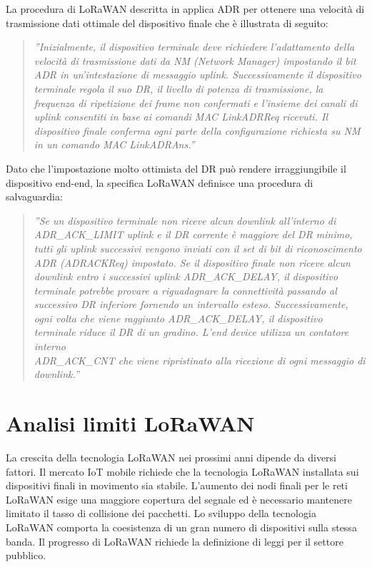 \documentclass[a4paper]{report} %
\begin{document}
La procedura di LoRaWAN descritta in \cite{art:rif.48} applica ADR per ottenere una velocità di trasmissione dati ottimale del dispositivo finale che è illustrata di seguito:
\begin{quote}
	\textit{''Inizialmente, il dispositivo terminale deve richiedere l'adattamento della velocità di trasmissione dati da NM (Network Manager) impostando il bit ADR in un'intestazione di messaggio uplink. Successivamente il dispositivo terminale regola il suo DR, il livello di potenza di trasmissione, la frequenza di ripetizione dei frame non confermati e l'insieme dei canali di uplink consentiti in base ai comandi MAC LinkADRReq ricevuti. Il dispositivo finale conferma ogni parte della configurazione richiesta su NM in un comando MAC LinkADRAns.''}
\end{quote}	
Dato che l'impostazione molto ottimista del DR può rendere irraggiungibile il dispositivo end-end, la specifica LoRaWAN definisce una procedura di salvaguardia: 
\begin{quote}
	\textit{''Se un dispositivo terminale non riceve alcun downlink all'interno di ADR\_ACK\_LIMIT uplink e il DR corrente è maggiore del DR minimo, tutti gli uplink successivi vengono inviati con il set di bit di riconoscimento ADR (ADRACKReq) impostato. Se il dispositivo finale non riceve alcun downlink entro i successivi uplink ADR\_ACK\_DELAY, il dispositivo terminale potrebbe provare a riguadagnare la connettività passando al successivo DR inferiore fornendo un intervallo esteso. Successivamente, ogni volta che viene raggiunto ADR\_ACK\_DELAY, il dispositivo terminale riduce il DR di un gradino. L'end device utilizza un contatore interno \\ ADR\_ACK\_CNT che viene ripristinato alla ricezione di ogni messaggio di downlink.''}
\end{quote}

\section{Analisi limiti LoRaWAN}
La crescita della tecnologia LoRaWAN nei prossimi anni dipende da diversi fattori. Il mercato IoT mobile richiede che la tecnologia LoRaWAN installata sui dispositivi finali in movimento sia stabile. L'aumento dei nodi finali per le reti LoRaWAN esige una maggiore copertura del segnale ed è necessario mantenere limitato il tasso di collisione dei pacchetti. Lo sviluppo della tecnologia LoRaWAN comporta la coesistenza di un gran numero di dispositivi sulla stessa banda. Il progresso di LoRaWAN richiede la definizione di leggi per il settore pubblico.
\end{document}
